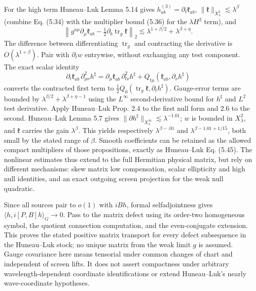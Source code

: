 \documentclass[11pt]{article}
\begin{document}
For the high term Huneau--Luk Lemma 5.14 gives \(h^{(3)}_{ab}=\partial_t \mathfrak k_{ab}\), \(\|\mathfrak k\|_{X_\lambda^2}\lesssim \lambda^\beta\) (combine Eq. (5.34) with the multiplier bound (5.36) for the \(\lambda H^2\) term), and
\[
 \left\|g^{a\mu}\partial_\mu\mathfrak k_{ab}-\tfrac12\partial_b\operatorname{tr}_g\mathfrak k\right\|_2
 \lesssim \lambda^{1+\beta/2}+\lambda^{\beta+\eta}.
\]
The difference between differentiating \(\operatorname{tr}_g\) and contracting the derivative is \(O(\lambda^{1+\beta})\). Pair with \(\partial_t w\) entrywise, without exchanging any test component. The exact scalar identity
\[
 \partial_t\mathfrak k_{ab}\,\partial_{\mu\nu}^2h^\sharp
 =\partial_\mu\mathfrak k_{ab}\,\partial^2_{t\nu}h^\sharp+
 Q_{t\mu}(\mathfrak k_{ab},\partial_\nu h^\sharp)
\]
converts the contracted first term to \(\tfrac12 Q_0(\operatorname{tr}_g\mathfrak k,\partial_t h^\sharp)\). Gauge-error terms are bounded by \(\lambda^{\beta/2}+\lambda^{\beta+\eta-1}\) using the \(L^\infty\) second-derivative bound for \(h^\sharp\) and \(L^2\) test derivative. Apply Huneau--Luk Prop. 2.4 to the first null form and 2.6 to the second. Huneau--Luk Lemma 5.7 gives \(\|\partial h^\sharp\|_{X_\lambda^\infty}\lesssim\lambda^{-1.01}\); \(w\) is bounded in \(X_\lambda^2\), and \(\mathfrak k\) carries the gain \(\lambda^\beta\). This yields respectively \(\lambda^{\beta-.01}\) and \(\lambda^{\beta-1.01+1/15}\), both small by the stated range of \(\beta\). Smooth coefficients can be retained as the allowed compact multipliers of those propositions, exactly as Huneau--Luk Eq. (5.45). The nonlinear estimates thus extend to the full Hermitian physical matrix, but rely on different mechanisms: skew matrix low compensation, scalar ellipticity and high null identities, and an exact outgoing screen projection for the weak null quadratic.

Since all sources pair to \(o(1)\) with \(iB h\), formal selfadjointness gives \(\langle h,i[P,B]h\rangle_G\to0\). Pass to the matrix defect using its order-two homogeneous symbol, the quotient connection computation, and the even-conjugate extension. This proves the stated positive matrix transport for every defect subsequence in the Huneau--Luk stock; no unique matrix from the weak limit \(g\) is assumed. Gauge covariance here means tensorial under common changes of chart and independent of screen lifts. It does not assert compactness under arbitrary wavelength-dependent coordinate identifications or extend Huneau--Luk's nearly wave-coordinate hypotheses.
\end{document}
